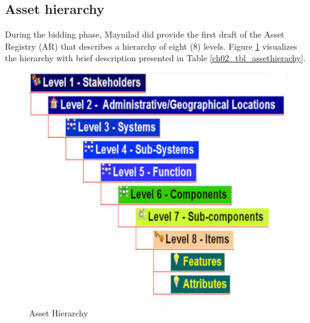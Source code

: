 \subsection{Asset hierarchy}
\label{214}
During the bidding phase, Maynilad did provide the first draft of the Asset Registry (AR) that describes a hierarchy of eight (8) levels. Figure \ref{ch02_assethierachy} visualizes the hierarchy with brief description presented in Table \ref{ch02_tbl_assethierachy}.

\begin{figure}[!htb]
	\includegraphics[scale=1.3]{figures/ch02_assethierarchy} \\
	\caption{Asset Hierarchy}
	\label{ch02_assethierachy} 
\end{figure}

